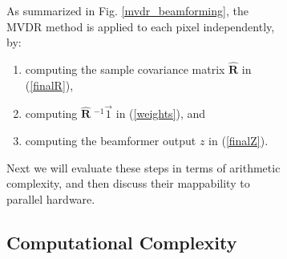 \documentclass[12pt,journal,draftclsnofoot,onecolumn]{IEEEtran}
\let\MYoriglatexcaption\caption               %
\renewcommand{\caption}[2][\relax]{\MYoriglatexcaption[#2]{#2}}
\newcommand\mat[1]{\boldsymbol{#1}}
\newcommand\1{\vec 1}
\newcommand*\eR{\mat{\hat R}}
\newcommand*\eRi{\hat{\mat R}\;\!^{-1}}
\begin{document}
\begin{figure}
\begin{figure}
As summarized in Fig. \ref{mvdr_beamforming}, the MVDR method is applied to each pixel independently, by:
\begin{enumerate}
\item computing the sample covariance matrix $\eR$ in (\ref{finalR}),
\item computing $\eRi\1$ in (\ref{weights}), and
\item computing the beamformer output $z$ in (\ref{finalZ}).
\end{enumerate}
Next we will evaluate these steps in terms of arithmetic complexity, and then discuss their mappability to parallel hardware.

\subsection{Computational Complexity}

 


\end{figure}
\end{figure}
\end{document}

